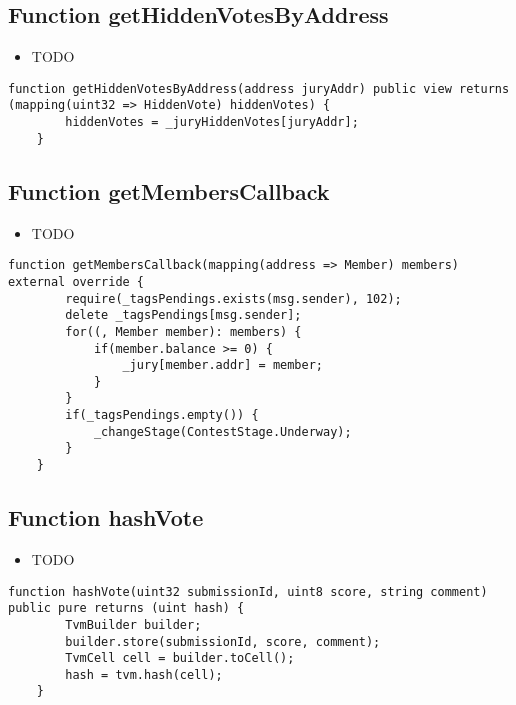 \subsection{Function getHiddenVotesByAddress}

\begin{itemize}
\item TODO
\end{itemize}

\begin{lstlisting}[firstnumber=145]
    function getHiddenVotesByAddress(address juryAddr) public view returns (mapping(uint32 => HiddenVote) hiddenVotes) {
        hiddenVotes = _juryHiddenVotes[juryAddr];
    }
\end{lstlisting}

\subsection{Function getMembersCallback}

\begin{itemize}
\item TODO
\end{itemize}

\begin{lstlisting}[firstnumber=87]
    function getMembersCallback(mapping(address => Member) members) external override {
        require(_tagsPendings.exists(msg.sender), 102);
        delete _tagsPendings[msg.sender];
        for((, Member member): members) {
            if(member.balance >= 0) {
                _jury[member.addr] = member;
            }
        }
        if(_tagsPendings.empty()) {
            _changeStage(ContestStage.Underway);
        }
    }
\end{lstlisting}

\subsection{Function hashVote}

\begin{itemize}
\item TODO
\end{itemize}

\begin{lstlisting}[firstnumber=223]
    function hashVote(uint32 submissionId, uint8 score, string comment) public pure returns (uint hash) {
        TvmBuilder builder;
        builder.store(submissionId, score, comment);
        TvmCell cell = builder.toCell();
        hash = tvm.hash(cell);
    }
\end{lstlisting}

